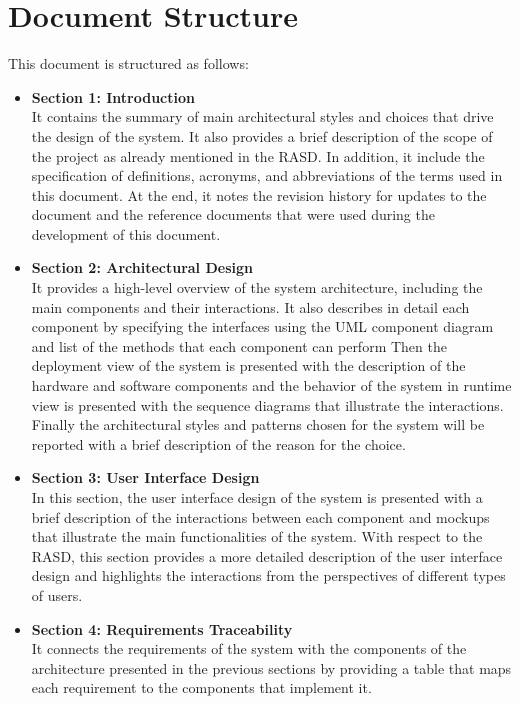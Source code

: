 \section{Document Structure}\label{sec:structure}
This document is structured as follows:
\begin{itemize}
    \item \textbf{Section 1: Introduction} 
    \\It contains the summary of main architectural styles and choices that drive the design of the system. It also provides a brief description of the scope of the 
    project as already mentioned in the RASD. In addition, it include the specification of definitions, acronyms, and abbreviations of the terms used in this document. 
    At the end, it notes the revision history for updates to the document and the reference documents that were used during the development of this document.
    \item \textbf{Section 2: Architectural Design} 
    \\It provides a high-level overview of the system architecture, including the main components and their interactions. It also describes in detail each component
    by specifying the interfaces using the UML component diagram and list of the methods that each component can perform
    Then the deployment view of the system is presented with the description of the hardware and software components and the behavior of the system in runtime view 
    is presented with the sequence diagrams that illustrate the interactions. Finally the architectural styles and patterns chosen for the system will be 
    reported with a brief description of the reason for the choice.
    \item \textbf{Section 3: User Interface Design}
    \\In this section, the user interface design of the system is presented with a brief description of the interactions between each component and mockups that 
    illustrate the main functionalities of the system. With respect to the RASD, this section provides a more detailed description of the user interface design and 
    highlights the interactions from the perspectives of different types of users.
    \item \textbf{Section 4: Requirements Traceability}
    \\It connects the requirements of the system with the components of the architecture presented in the previous sections by providing a table that maps each
    requirement to the components that implement it. 

\end{itemize}
